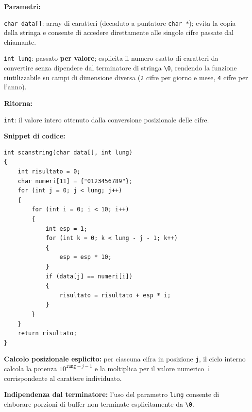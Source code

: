\documentclass[11pt,a4paper,oneside,openany]{book}
\newenvironment{listacomp}{%
    \small
    \begin{list}{\textendash}{%
        \setlength{\topsep}{2pt}%
        \setlength{\partopsep}{0pt}%
        \setlength{\itemsep}{1pt}%
        \setlength{\parsep}{0pt}%
        \setlength{\leftmargin}{1.2em}%
    }%
}{%
    \end{list}%
}
\begin{document}
\noindent\textbf{Parametri:}
\begin{listacomp}
    \item \texttt{char data[]}: array di caratteri (decaduto a puntatore \texttt{char *}); evita la copia della stringa e consente di accedere direttamente alle singole cifre passate dal chiamante.
    \item \texttt{int lung}: passato \textbf{per valore}; esplicita il numero esatto di caratteri da convertire senza dipendere dal terminatore di stringa \texttt{\textbackslash 0}, rendendo la funzione riutilizzabile su campi di dimensione diversa (\texttt{2} cifre per giorno e mese, \texttt{4} cifre per l'anno).
\end{listacomp}

\noindent\textbf{Ritorna:}
\begin{listacomp}
    \item \texttt{int}: il valore intero ottenuto dalla conversione posizionale delle cifre.
\end{listacomp}

\begin{samepage}
\noindent\textbf{Snippet di codice:}
\begin{lstlisting}[caption={Conversione posizionale da stringa numerica a intero in scanstring()}]
int scanstring(char data[], int lung)
{
    int risultato = 0;
    char numeri[11] = {"0123456789"};
    for (int j = 0; j < lung; j++)
    {
        for (int i = 0; i < 10; i++)
        {
            int esp = 1;
            for (int k = 0; k < lung - j - 1; k++)
            {
                esp = esp * 10;
            }
            if (data[j] == numeri[i])
            {
                risultato = risultato + esp * i;
            }
        }
    }
    return risultato;
}
\end{lstlisting}

\begin{listacomp}
    \item \textbf{Calcolo posizionale esplicito:} per ciascuna cifra in posizione \texttt{j}, il ciclo interno calcola la potenza $10^{\texttt{lung}-j-1}$ e la moltiplica per il valore numerico \texttt{i} corrispondente al carattere individuato.
    \item \textbf{Indipendenza dal terminatore:} l'uso del parametro \texttt{lung} consente di elaborare porzioni di buffer non terminate esplicitamente da \texttt{\textbackslash 0}.
\end{listacomp}
\end{samepage}
\end{document}
